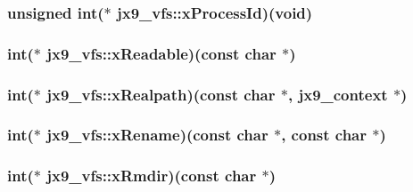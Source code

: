 \hypertarget{structjx9__vfs_a0a08953436ce2a9776cc7a8a671093dc}{
\subsubsection[{x\-Process\-Id}]{\setlength{\rightskip}{0pt plus 5cm}unsigned int($\ast$ jx9\-\_\-vfs\-::x\-Process\-Id)(void)}}\label{da/d75/structjx9__vfs_a0a08953436ce2a9776cc7a8a671093dc}
\hypertarget{structjx9__vfs_ad126634728b2e871f7428bd40148f0df}{
\subsubsection[{x\-Readable}]{\setlength{\rightskip}{0pt plus 5cm}int($\ast$ jx9\-\_\-vfs\-::x\-Readable)(const char $\ast$)}}\label{da/d75/structjx9__vfs_ad126634728b2e871f7428bd40148f0df}
\hypertarget{structjx9__vfs_a11d4a7866eb86ca4fa23eb2c27733777}{
\subsubsection[{x\-Realpath}]{\setlength{\rightskip}{0pt plus 5cm}int($\ast$ jx9\-\_\-vfs\-::x\-Realpath)(const char $\ast$, {\bf jx9\-\_\-context} $\ast$)}}\label{da/d75/structjx9__vfs_a11d4a7866eb86ca4fa23eb2c27733777}
\hypertarget{structjx9__vfs_a076ad5ae9eb89d2369c4d9b99393febf}{
\subsubsection[{x\-Rename}]{\setlength{\rightskip}{0pt plus 5cm}int($\ast$ jx9\-\_\-vfs\-::x\-Rename)(const char $\ast$, const char $\ast$)}}\label{da/d75/structjx9__vfs_a076ad5ae9eb89d2369c4d9b99393febf}
\hypertarget{structjx9__vfs_aa4f4f0ad5049e858afeda247ca9bdc10}{
\subsubsection[{x\-Rmdir}]{\setlength{\rightskip}{0pt plus 5cm}int($\ast$ jx9\-\_\-vfs\-::x\-Rmdir)(const char $\ast$)}}\label{da/d75/structjx9__vfs_aa4f4f0ad5049e858afeda247ca9bdc10}
